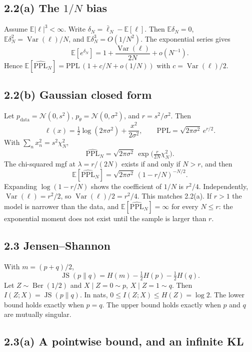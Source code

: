 \documentclass[11pt]{article}
\theoremstyle{remark}
\newcommand{\E}{\mathbb{E}}
\newcommand{\Var}{\operatorname{Var}}
\newcommand{\JS}{\operatorname{JS}}
\newcommand{\Ber}{\operatorname{Ber}}
\newcommand{\N}{\mathcal{N}}
\begin{document}
\subsection*{2.2(a) The \texorpdfstring{\(1/N\)}{1/N} bias}

Assume \(\E|\ell|^3<\infty\). Write \(\delta_N=\bar\ell_N-\E[\ell]\). Then \(\E\delta_N=0\), \(\E\delta_N^2=\Var(\ell)/N\), and \(\E\delta_N^3=O(1/N^2)\). The exponential series gives
\[
\E[e^{\delta_N}]=1+\frac{\Var(\ell)}{2N}+o(N^{-1}).
\]
Hence \(\E[\widehat{\mathrm{PPL}}_N]=\mathrm{PPL}\,(1+c/N+o(1/N))\) with \(c=\Var(\ell)/2\).

\subsection*{2.2(b) Gaussian closed form}

Let \(p_{\mathrm{data}}=\N(0,s^2)\), \(p_\theta=\N(0,\sigma^2)\), and \(r=s^2/\sigma^2\). Then
\[
\ell(x)=\tfrac12\log(2\pi\sigma^2)+\frac{x^2}{2\sigma^2},\qquad
\mathrm{PPL}=\sqrt{2\pi\sigma^2}\,e^{r/2}.
\]
With \(\sum_n x_n^2=s^2\chi^2_N\),
\[
\widehat{\mathrm{PPL}}_N=\sqrt{2\pi\sigma^2}\,\exp\big(\tfrac{r}{2N}\chi^2_N\big).
\]
The chi-squared mgf at \(\lambda=r/(2N)\) exists if and only if \(N>r\), and then
\[
\E[\widehat{\mathrm{PPL}}_N]
=\sqrt{2\pi\sigma^2}\,(1-r/N)^{-N/2}.
\]
Expanding \(\log(1-r/N)\) shows the coefficient of \(1/N\) is \(r^2/4\). Independently, \(\Var(\ell)=r^2/2\), so \(\Var(\ell)/2=r^2/4\). This matches 2.2(a). If \(r>1\) the model is narrower than the data, and \(\E[\widehat{\mathrm{PPL}}_N]=\infty\) for every \(N\le r\): the exponential moment does not exist until the sample is larger than \(r\).

\subsection*{2.3 Jensen--Shannon}

With \(m=(p+q)/2\),
\[
\JS(p\|q)
=H(m)-\tfrac12 H(p)-\tfrac12 H(q).
\]
Let \(Z\sim\Ber(1/2)\) and \(X\mid Z=0\sim p\), \(X\mid Z=1\sim q\). Then \(I(Z;X)=\JS(p\|q)\). In nats, \(0\le I(Z;X)\le H(Z)=\log 2\). The lower bound holds exactly when \(p=q\). The upper bound holds exactly when \(p\) and \(q\) are mutually singular.

\subsection*{2.3(a) A pointwise bound, and an infinite KL}
\end{document}
